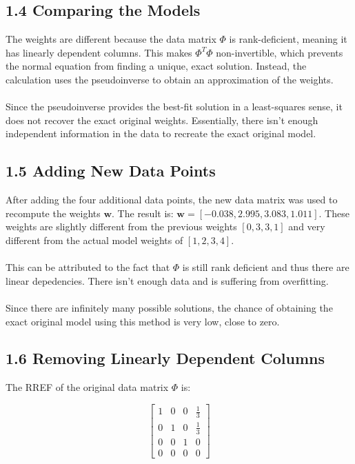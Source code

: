 \documentclass[12pt]{article}
\begin{document}
\subsection*{1.4 Comparing the Models}
The weights are different because the data matrix \(\Phi\) is rank-deficient, meaning it has linearly dependent columns. This makes \(\Phi^T \Phi\) non-invertible, which prevents the normal equation from finding a unique, exact solution. Instead, the calculation uses the pseudoinverse to obtain an approximation of the weights.
\\ \\
Since the pseudoinverse provides the best-fit solution in a least-squares sense, it does not recover the exact original weights. Essentially, there isn’t enough independent information in the data to recreate the exact original model.

\subsection*{1.5 Adding New Data Points}
After adding the four additional data points, the new data matrix was used to recompute the weights \( \mathbf{w} \). The result is: $\mathbf{w} = [-0.038, 2.995, 3.083, 1.011]$. These weights are slightly different from the previous weights \([0, 3, 3, 1]\) and very different from the actual model weights of $[1, 2, 3, 4]$.
\\ \\
This can be attributed to the fact that $\Phi$ is still rank deficient and thus there are linear depedencies. There isn't enough data and is suffering from overfitting.
\\ \\
Since there are infinitely many possible solutions, the chance of obtaining the exact original model using this method is very low, close to zero.

\subsection*{1.6 Removing Linearly Dependent Columns}
The RREF of the original data matrix \(\Phi\) is:

\[
\begin{bmatrix}
1 & 0 & 0 & \frac{1}{3} \\
0 & 1 & 0 & \frac{1}{3} \\
0 & 0 & 1 & 0 \\
0 & 0 & 0 & 0
\end{bmatrix}
\]
\end{document}
